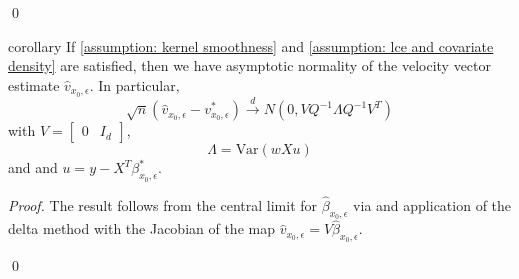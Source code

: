 \documentclass[11pt]{article}
\begin{document}
\qed{}

\begin{restatable}{corollary}{} \label{corr: central limit for v}
    If \cref{assumption: kernel smoothness} and \cref{assumption: lce and covariate density} are satisfied, then we have asymptotic normality of the velocity vector estimate $\hat{v}_{x_0, \epsilon}$. In particular,
    \[\sqrt{n}(\hat{v}_{x_0, \epsilon} - v^*_{x_0, \epsilon}) \overset{d}{\rightarrow}N(0, VQ^{-1}\Lambda Q^{-1}V^T)\]
    with $V = \begin{bmatrix}
        0 & I_d
    \end{bmatrix}$, 
    \[\Lambda = \text{Var}(wXu)\]
    and and $u = y - X^T\beta_{x_0, \epsilon}^*$.
\end{restatable}
\noindent \textit{Proof.} The result follows from the central limit for $\hat{\beta}_{x_0, \epsilon}$ via  and application of the delta method with the Jacobian of the map $\hat{v}_{x_0, \epsilon} = V\hat{\beta}_{x_0, \epsilon}$. 

\qed{}
\end{document}
